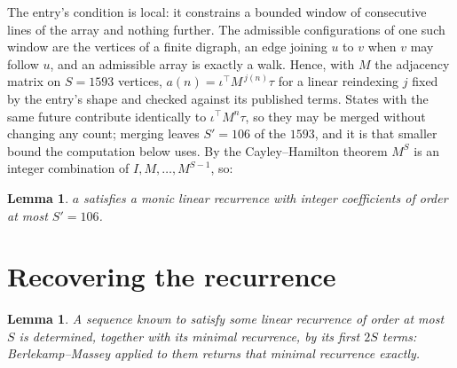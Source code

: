 \documentclass[11pt,a4paper]{article}
\theoremstyle{plain}
\newtheorem{lemma}[theorem]{Lemma}
\theoremstyle{definition}
\begin{document}
The entry's condition is local: it constrains a bounded window of consecutive lines of the
array and nothing further. The admissible configurations of one such window are the vertices
of a finite digraph, an edge joining $u$ to $v$ when $v$ may follow $u$, and an admissible
array is exactly a walk. Hence, with $M$ the adjacency matrix on $S=1593$ vertices,
$a(n)=\iota^{\!\top}M^{\,j(n)}\tau$ for a linear reindexing $j$ fixed by the entry's shape
and checked against its published terms. States with the same future contribute identically to $\iota^{\!\top}M^n\tau$, so they may be merged without changing any count; merging leaves $S'=106$ of the $1593$, and it is that smaller bound the computation below uses. By the Cayley--Hamilton theorem $M^{S}$ is an
integer combination of $I,M,\dots,M^{S-1}$, so:

\begin{lemma}\label{lem:cf}
$a$ satisfies a monic linear recurrence with integer coefficients of order at most
$S'=106$.
\end{lemma}

\section{Recovering the recurrence}

\begin{lemma}\label{lem:bm}
A sequence known to satisfy some linear recurrence of order at most $S$ is determined, together
with its minimal recurrence, by its first $2S$ terms: Berlekamp--Massey applied to them returns
that minimal recurrence exactly.
\end{lemma}
\end{document}
